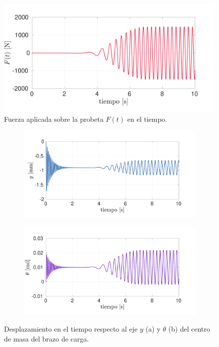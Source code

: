 \begin{figure}[h]
\centering
\includegraphics[width=0.95\linewidth, trim={0cm 1cm 2cm 1cm},clip]{Imagenes/f_2.pdf}
\caption{Fuerza aplicada sobre la probeta $F(t)$ en el tiempo.}
\label{fig:f_2}
\end{figure}

\begin{figure}[p]
\centering
	\begin{subfigure}{1\linewidth}
		\centering
		\includegraphics[width=1\linewidth]{Imagenes/y_2.pdf}
		\caption{}\label{fig:y_2}
	\end{subfigure}
	\begin{subfigure}{1\linewidth}
		\centering
		\includegraphics[width=1\linewidth]{Imagenes/t_2.pdf}
		\caption{}\label{fig:t_2}
	\end{subfigure}
\par\bigskip
\caption{Desplazamiento en el tiempo respecto al eje $y$ (a) y $\theta$ (b) del centro de masa del brazo de carga.}
\label{fig:yt_2}
\end{figure}


